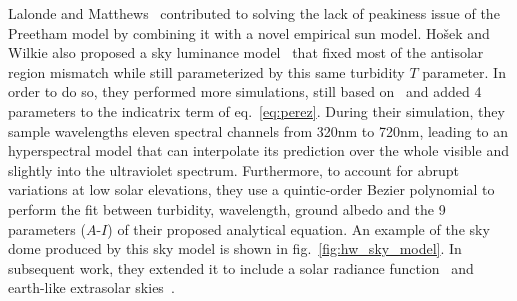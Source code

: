Lalonde and Matthews~\cite{lalonde-3dv-14} contributed to solving the lack of peakiness issue of the Preetham model by combining it with a novel empirical sun model. Ho\v{s}ek and Wilkie also proposed a sky luminance model~\cite{hosek-siggraph-12} that fixed most of the antisolar region mismatch while still parameterized by this same turbidity $T$ parameter. In order to do so, they performed more simulations, still based on~\cite{nishita1996display} and added 4 parameters to the indicatrix term of eq.~\eqref{eq:perez}. During their simulation, they sample wavelengths eleven spectral channels from 320nm to 720nm, leading to an hyperspectral model that can interpolate its prediction over the whole visible and slightly into the ultraviolet spectrum. Furthermore, to account for abrupt variations at low solar elevations, they use a quintic-order Bezier polynomial to perform the fit between turbidity, wavelength, ground albedo and the 9 parameters ($A$-$I$) of their proposed analytical equation. An example of the sky dome produced by this sky model is shown in fig.~\ref{fig:hw_sky_model}. In subsequent work, they extended it to include a solar radiance function~\cite{hosek-cga-13} and earth-like extrasolar skies~\cite{wilkie2013predicting}.


